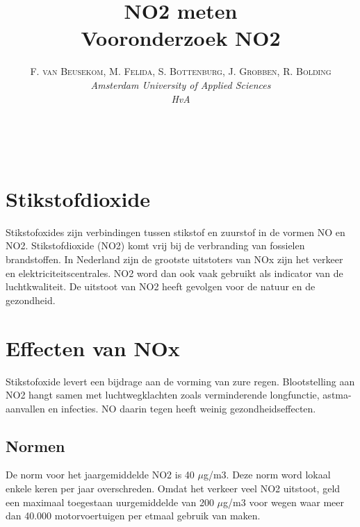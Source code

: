 \documentclass[a4paper, 11pt]{article} %
\title{\textbf{NO2 meten}\\ %
Vooronderzoek NO2} %
\author{\textsc{F. van Beusekom, M. Felida, S. Bottenburg, J. Grobben, R. Bolding} %
\\{\textit{Amsterdam University of Applied Sciences\\ 
HvA}}} %
\makeatletter
\renewcommand{\maketitle}{ %
\begin{flushright} %
{\LARGE\@title} %

\vspace{50pt} %

{\large\@author} %
\\\@date %

\vspace{40pt} %
\end{flushright}
}
\makeatother
\begin{document}
\captionsetup{justification=centering}
\hypersetup{hidelinks=true}
\maketitle %




\vspace{10pt} %

\newpage
\section{Stikstofdioxide}

Stikstofoxides zijn verbindingen tussen stikstof en zuurstof in de vormen NO en NO2. Stikstofdioxide (NO2) komt vrij bij de verbranding van fossielen brandstoffen. In Nederland zijn de grootste uitstoters van NOx zijn het verkeer en elektriciteitscentrales. NO2 word dan ook vaak gebruikt als indicator van de luchtkwaliteit. De uitstoot van NO2 heeft gevolgen voor de natuur en de gezondheid. 


\section{Effecten van NOx}

Stikstofoxide levert een bijdrage aan de vorming van zure regen. Blootstelling aan NO2 hangt samen met luchtwegklachten zoals verminderende longfunctie, astma-aanvallen en infecties. NO daarin tegen heeft weinig gezondheidseffecten. 


\subsection{Normen}

De norm voor het jaargemiddelde NO2 is 40 $\mu$g/m3. Deze norm word lokaal enkele keren per jaar overschreden. Omdat het verkeer veel NO2 uitstoot, geld een maximaal toegestaan uurgemiddelde van 200  $\mu$g/m3 voor wegen waar meer dan 40.000 motorvoertuigen per etmaal gebruik van maken.
\end{document}
